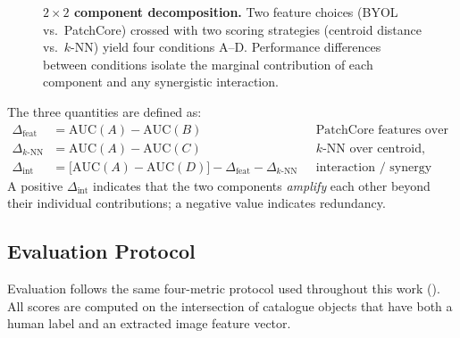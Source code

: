 \begin{figure}[H]
\caption{%
  \textbf{$2\times2$ component decomposition.}
  Two feature choices (BYOL vs.\ PatchCore) crossed with two scoring
  strategies (centroid distance vs.\ $k$-NN) yield four conditions A--D.
  Performance differences between conditions isolate the marginal
  contribution of each component and any synergistic interaction.}
\label{fig:2x2}
\end{figure}

The three quantities are defined as:
\begin{align}
  \Delta_\text{feat}
    &= \mathrm{AUC}(A) - \mathrm{AUC}(B)
    && \text{PatchCore features over BYOL, scorer fixed}
    \label{eq:feat_gain}\\
  \Delta_{k\text{-NN}}
    &= \mathrm{AUC}(A) - \mathrm{AUC}(C)
    && \text{$k$-NN over centroid, PatchCore features fixed}
    \label{eq:knn_gain}\\
  \Delta_\text{int}
    &= \bigl[\mathrm{AUC}(A){-}\mathrm{AUC}(D)\bigr]
       - \Delta_\text{feat} - \Delta_{k\text{-NN}}
    && \text{interaction / synergy}
    \label{eq:interaction}
\end{align}
A positive $\Delta_\text{int}$ indicates that the two components
\emph{amplify} each other beyond their individual contributions; a
negative value indicates redundancy.

\subsection{Evaluation Protocol}
\label{sec:patchcore:eval}

Evaluation follows the same four-metric protocol used throughout this
work ().  All scores are computed on the intersection
of catalogue objects that have both a human label and an extracted
image feature vector.

